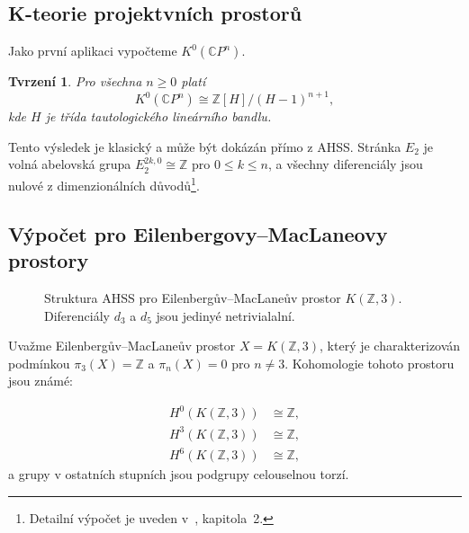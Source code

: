 \documentclass[12pt,a4paper]{article}
\theoremstyle{plain}
\newtheorem{proposition}[theorem]{Tvrzen\'{i}}
\theoremstyle{definition}
\theoremstyle{remark}
\begin{document}
\subsection{K-teorie projektvn\'{i}ch prostor\r{u}}

Jako prvn\'{i} aplikaci vypo\v{c}teme $K^0(\mathbb{C}P^n)$.

\begin{proposition}
\label{prop:cpn}
Pro v\v{s}echna $n \geq 0$ plat\'{i}
\[
K^0(\mathbb{C}P^n) \cong \mathbb{Z}[H]/(H-1)^{n+1},
\]
kde $H$ je t\v{r}\'{i}da tautologick\'{e}ho line\'{a}rn\'{i}ho bandlu.
\end{proposition}

Tento v\'{y}sledek je klasick\'{y} a m\r{u}\v{z}e b\'{y}t dok\'{a}z\'{a}n
p\v{r}\'{i}mo z AHSS. Str\'{a}nka $E_2$ je voln\'{a} abelovsk\'{a} grupa
$E_2^{2k,0} \cong \mathbb{Z}$ pro $0 \leq k \leq n$, a v\v{s}echny
diferenci\'{a}ly jsou nulov\'{e} z dimenzion\'{a}ln\'{i}ch d\r{u}vod\r{u}\footnote{%
Detailn\'{i} v\'{y}po\v{c}et je uveden v~\citet{hatcher2003vb}, kapitola~2.}.

\subsection{V\'{y}po\v{c}et pro Eilenbergovy--MacLaneovy prostory}

\begin{figure}[ht]
\centering
{}
\caption{Struktura AHSS pro Eilenberg\r{u}v--MacLane\r{u}v prostor $K(\mathbb{Z},3)$.
Diferenci\'{a}ly $d_3$ a $d_5$ jsou jediny\'{e} netrivialaln\'{i}.}
\label{fig:ahss_kz3}
\end{figure}

Uva\v{z}me Eilenberg\r{u}v--MacLane\r{u}v prostor $X = K(\mathbb{Z}, 3)$,
kter\'{y} je charakterizov\'{a}n podm\'{i}nkou $\pi_3(X) = \mathbb{Z}$ a
$\pi_n(X) = 0$ pro $n \neq 3$. Kohomologie tohoto prostoru jsou zn\'{a}m\'{e}:

\begin{align}
H^0(K(\mathbb{Z},3)) &\cong \mathbb{Z}, \label{eq:kz3_h0} \\
H^3(K(\mathbb{Z},3)) &\cong \mathbb{Z}, \label{eq:kz3_h3} \\
H^6(K(\mathbb{Z},3)) &\cong \mathbb{Z}, \label{eq:kz3_h6}
\end{align}
a grupy v ostatn\'{i}ch stupn\'{i}ch jsou podgrupy celouselnou torz\'{i}.
\end{document}
